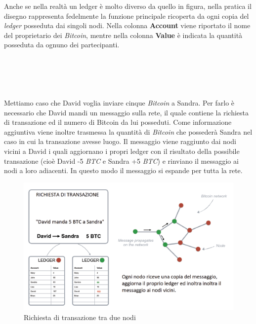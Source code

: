 \documentclass[11pt]{thesistemp}
\begin{document}
Anche se nella realtà un ledger è molto diverso da quello in figura, nella pratica il disegno rappresenta fedelmente la funzione principale ricoperta da ogni copia del \textit{ledger} posseduta dai singoli nodi.
Nella colonna \textbf{Account} viene riportato il nome del proprietario dei \textit{Bitcoin}, mentre nella colonna \textbf{Value} è indicata la quantità posseduta da ognuno dei partecipanti.\\\\\\\\\\\\
Mettiamo caso che David voglia inviare cinque \textit{Bitcoin} a Sandra.
Per farlo è necessario che David mandi un messaggio sulla rete, il quale contiene la richiesta di transazione ed il numero di Bitcoin da lui posseduti.
Come informazione aggiuntiva viene inoltre trasmessa la quantità di \textit{Bitcoin} che possederà Sandra nel caso in cui la transazione avesse luogo. 
Il messaggio viene raggiunto dai nodi vicini a David i quali aggiornano i propri ledger con il risultato della possibile transazione (cioè David -5 \textit{BTC} e Sandra +5 \textit{BTC}) e rinviano il messaggio ai nodi a loro adiacenti. 
In questo modo il messaggio si espande per tutta la rete.
\begin{figure}[h]\hfill
    \centering
    \includegraphics[width=\textwidth]{transaction.png}
    \caption{ Richiesta di transazione tra due nodi}
    \label{fig:transaction}
\end{figure}\\
\end{document}
